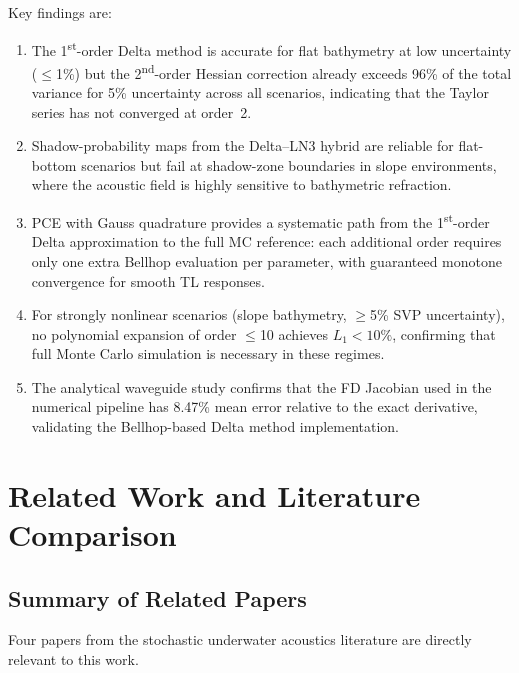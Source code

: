 \documentclass[11pt,a4paper]{article}
\begin{document}
Key findings are:
\begin{enumerate}
  \item The 1\textsuperscript{st}-order Delta method is accurate for flat bathymetry
        at low uncertainty ($\leq$1\%) but the 2\textsuperscript{nd}-order Hessian
        correction already exceeds 96\% of the total variance for 5\% uncertainty
        across all scenarios, indicating that the Taylor series has not converged
        at order~2.
  \item Shadow-probability maps from the Delta--LN3 hybrid are reliable for flat-bottom
        scenarios but fail at shadow-zone boundaries in slope environments, where
        the acoustic field is highly sensitive to bathymetric refraction.
  \item PCE with Gauss quadrature provides a systematic path from the 1\textsuperscript{st}-order
        Delta approximation to the full MC reference: each additional order requires
        only one extra Bellhop evaluation per parameter, with guaranteed monotone
        convergence for smooth TL responses.
  \item For strongly nonlinear scenarios (slope bathymetry, $\geq$5\% SVP uncertainty),
        no polynomial expansion of order $\leq$10 achieves $L_1 < 10\%$, confirming
        that full Monte Carlo simulation is necessary in these regimes.
  \item The analytical waveguide study confirms that the FD Jacobian used in the
        numerical pipeline has 8.47\% mean error relative to the exact derivative,
        validating the Bellhop-based Delta method implementation.
\end{enumerate}

\section{Related Work and Literature Comparison}
\label{sec:related}

\subsection{Summary of Related Papers}
\label{sec:papers}

Four papers from the stochastic underwater acoustics literature are directly
relevant to this work.
\end{document}
